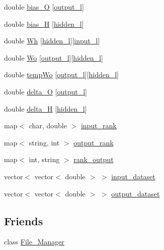 \begin{DoxyCompactItemize}
double \hyperlink{a00003_a8f26363ac0ccda6f04df35e68164cd3a}{bias\-\_\-\-O} \mbox{[}\hyperlink{a00008_a0a0ddfc9fb3bc3d90d175ed1f7bd54c5}{output\-\_\-l}\mbox{]}
\item 
double \hyperlink{a00003_a38808438a02d406a7ab54c8bf825752a}{bias\-\_\-\-H} \mbox{[}\hyperlink{a00008_aa7fdf42e8c0a65ea15cb37a990708e36}{hidden\-\_\-l}\mbox{]}
\item 
double \hyperlink{a00003_a45dfc138d645e05eaeaa6ca6bb3df818}{Wh} \mbox{[}\hyperlink{a00008_aa7fdf42e8c0a65ea15cb37a990708e36}{hidden\-\_\-l}\mbox{]}\mbox{[}\hyperlink{a00008_a8dae3b2c955083e02ba56da92adbf25d}{input\-\_\-l}\mbox{]}
\item 
double \hyperlink{a00003_ad6730ce7c9fc3937299dd32473b12d1d}{Wo} \mbox{[}\hyperlink{a00008_a0a0ddfc9fb3bc3d90d175ed1f7bd54c5}{output\-\_\-l}\mbox{]}\mbox{[}\hyperlink{a00008_aa7fdf42e8c0a65ea15cb37a990708e36}{hidden\-\_\-l}\mbox{]}
\item 
double \hyperlink{a00003_a1cca3513af05c6dce603fdf332b36691}{temp\-Wo} \mbox{[}\hyperlink{a00008_a0a0ddfc9fb3bc3d90d175ed1f7bd54c5}{output\-\_\-l}\mbox{]}\mbox{[}\hyperlink{a00008_aa7fdf42e8c0a65ea15cb37a990708e36}{hidden\-\_\-l}\mbox{]}
\item 
double \hyperlink{a00003_ae5f829ba5e65ae91d5c4feda5f66e37a}{delta\-\_\-\-O} \mbox{[}\hyperlink{a00008_a0a0ddfc9fb3bc3d90d175ed1f7bd54c5}{output\-\_\-l}\mbox{]}
\item 
double \hyperlink{a00003_a51e5c2d2b53ba284c5b3791446c3b7d8}{delta\-\_\-\-H} \mbox{[}\hyperlink{a00008_aa7fdf42e8c0a65ea15cb37a990708e36}{hidden\-\_\-l}\mbox{]}
\item 
map$<$ char, double $>$ \hyperlink{a00003_adf2c6662b130ed1582025ea2cccacbe2}{input\-\_\-rank}
\item 
map$<$ string, int $>$ \hyperlink{a00003_af46a9de8ef619f93fb8c0231be79163c}{output\-\_\-rank}
\item 
map$<$ int, string $>$ \hyperlink{a00003_a8e34531b701290d16068e3685f3066a4}{rank\-\_\-output}
\item 
vector$<$ vector$<$ double $>$ $>$ \hyperlink{a00003_a81bab51b36643c5b10ba25d518c27ff3}{input\-\_\-dataset}
\item 
vector$<$ vector$<$ double $>$ $>$ \hyperlink{a00003_aa8441449f55f07c3da384d81608373b5}{output\-\_\-dataset}
\end{DoxyCompactItemize}
\subsection*{Friends}
\begin{DoxyCompactItemize}
\item 
class \hyperlink{a00003_a96aa84fcda6b19a74fff9d19c16b07fe}{File\-\_\-\-Manager}
\end{DoxyCompactItemize}



